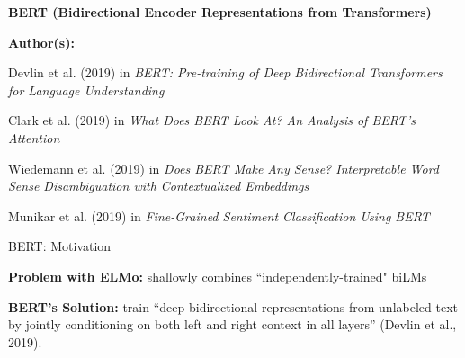\begin{frame}{}
    \begin{center}
        \large \textbf{BERT (Bidirectional Encoder Representations from Transformers)}
    \end{center}
    \vspace{20pt}
    
    \textbf{Author(s):}
    \begin{itemizeSpaced}{5pt}
    {\color{DimGrey} 
    
        \item Devlin et al. (2019) in \emph{BERT: Pre-training of Deep Bidirectional Transformers for Language Understanding}
        
        \item Clark et al. (2019) in \emph{What Does BERT Look At? An Analysis of BERT's Attention}
        
        \item Wiedemann et al. (2019) in \emph{Does BERT Make Any Sense? Interpretable Word Sense Disambiguation with Contextualized Embeddings}
        
        \item Munikar et al. (2019) in \emph{Fine-Grained Sentiment Classification Using BERT}
        
    }
    \end{itemizeSpaced}
\end{frame}





\begin{frame}{\large BERT: Motivation} 
    
    \begin{itemizeSpaced}{7pt}
        \small 
        
        \pinkbox \textbf{Problem with ELMo: } shallowly combines ``independently-trained" biLMs
        

        
        \pinkbox \textbf{BERT's Solution: } train ``deep bidirectional representations from unlabeled text by jointly conditioning on both left and right context in all layers” (Devlin et al., 2019).
    \end{itemizeSpaced}
    
\end{frame}


